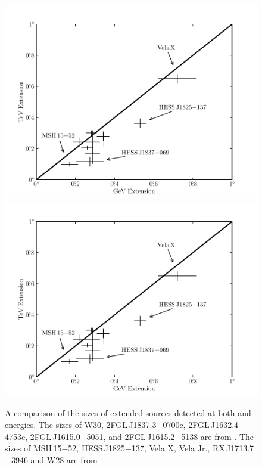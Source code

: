\clearpage
\begin{figure}
    \ifcolorfigure
      \includegraphics{summary_plots/gev_vs_tev_plot_color.pdf}
    \else
      \includegraphics{summary_plots/gev_vs_tev_plot_bw.pdf}
      \fi
    \caption{
    A comparison of the sizes of extended sources detected at
    both \gev and \tev energies.  The \tev sizes of W30,
    2FGL\,J1837.3$-$0700c, 2FGL\,J1632.4$-$4753c, 2FGL\,J1615.0$-$5051,
    and 2FGL\,J1615.2$-$5138 are from \cite{aharonian_2006_h.e.s.s.-survey}.
    The \tev sizes of MSH\,15$-$52, HESS\,J1825$-$137,
    Vela X, Vela Jr., RX\,J1713.7$-$3946 and W28 are from
}
\end{figure}
